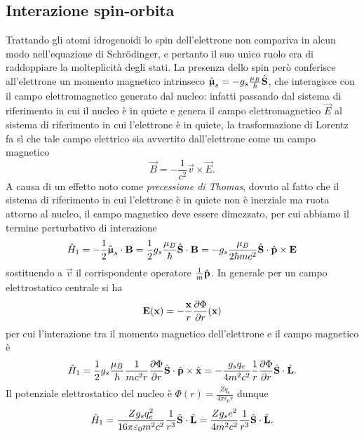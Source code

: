 \subsection{Interazione spin-orbita}
Trattando gli atomi idrogenoidi lo spin dell'elettrone non compariva in alcun modo nell'equazione di Schrödinger, e pertanto il suo unico ruolo era di raddoppiare la molteplicità degli stati.
La presenza dello spin però conferisce all'elettrone un momento magnetico intrinseco $\hat{\bm{\upmu}}_s=-g_s\frac{\mu_B}{\hbar}\hat{\mathbf{S}}$, che interagisce con il campo elettromagnetico generato dal nucleo: infatti passando dal sistema di riferimento in cui il nucleo è in quiete e genera il campo elettromagnetico $\vec E$ al sistema di riferimento in cui l'elettrone è in quiete, la trasformazione di Lorentz fa s\`i che tale campo elettrico sia avvertito dall'elettrone come un campo magnetico
\begin{equation}
    \vec B=-\frac1{c^2}\vec v\times\vec E.
\end{equation}
A causa di un effetto noto come \emph{precessione di Thomas}, dovuto al fatto che il sistema di riferimento in cui l'elettrone è in quiete non è inerziale ma ruota attorno al nucleo, il campo magnetico deve essere dimezzato, per cui abbiamo il termine perturbativo di interazione
\begin{equation}
    \hat{H}_1=
    -\frac12{\hat{\bm{\upmu}}_s}\cdot{\mathbf{B}}=
    \frac12g_s\frac{\mu_B}{\hbar}{\hat{\mathbf{S}}}\cdot{\mathbf{B}}=
    -g_s\frac{\mu_B}{2\hbar mc^2}{\hat{\mathbf{S}}}\cdot{\hat{\mathbf{p}}\times\mathbf{E}}
\end{equation}
sostituendo a $\vec v$ il corrispondente operatore $\frac1{m}\hat{\mathbf{p}}$.
In generale per un campo elettrostatico centrale si ha
\begin{equation}
    \mathbf{E}(\mathbf{x})=-\frac{\mathbf{x}}{r}\frac{\partial {\Phi}}{\partial {r}}(\mathbf{x})
\end{equation}
per cui l'interazione tra il momento magnetico dell'elettrone e il campo magnetico è
\begin{equation}
    \hat{H}_1=
    \frac12g_s\frac{\mu_B}{\hbar}\frac1{mc^2r}\frac{\partial {\Phi}}{\partial {r}}{\hat{\mathbf{S}}}\cdot{\hat{\mathbf{p}}\times\hat{\mathbf{x}}}=
    -\frac{g_sq_e}{4m^2c^2}\frac1{r}\frac{\partial {\Phi}}{\partial {r}}{\hat{\mathbf{S}}}\cdot{\hat{\mathbf{L}}}.
    \label{eq:interazione-spin-orbita}
\end{equation}
Il potenziale elettrostatico del nucleo è $\Phi(r)=\frac{Zq_e}{4\pi\epsilon_0r}$ dunque
\begin{equation}
    \hat{H}_1=
    \frac{Zg_sq_e^2}{16\pi\varepsilon_0m^2c^2}\frac1{r^3}{\hat{\mathbf{S}}}\cdot{\hat{\mathbf{L}}}=
    \frac{Zg_se^2}{4m^2c^2}\frac1{r^3}{\hat{\mathbf{S}}}\cdot{\hat{\mathbf{L}}}.
    \label{eq:interazione-spin-orbita-coulomb}
\end{equation}
